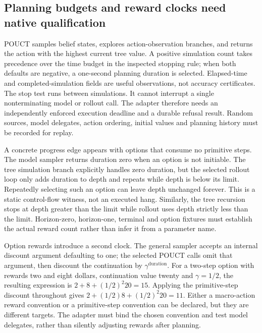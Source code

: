 \subsection{Planning budgets and reward clocks need native qualification}
\label{exec23:pomdppy-planning}
POUCT samples belief states, explores action-observation branches, and returns
the action with the highest current tree value. A positive simulation count
takes precedence over the time budget in the inspected stopping rule; when
both defaults are negative, a one-second planning duration is selected.
Elapsed-time and completed-simulation fields are useful observations, not
accuracy certificates. The stop test runs between simulations. It cannot
interrupt a single nonterminating model or rollout call. The adapter therefore
needs an independently enforced execution deadline and a durable refusal result.
Random sources, model delegates, action ordering, initial values and planning
history must be recorded for replay. \cite{exec23_pomdppy_sources}

A concrete progress edge appears with options that consume no primitive steps.
The model sampler returns duration zero when an option is not initiable.
The tree simulation branch explicitly handles zero duration, but the selected
rollout loop only adds duration to depth and repeats while depth is below its
limit. Repeatedly selecting such an option can leave depth unchanged forever.
This is a static control-flow witness, not an executed hang. Similarly, the
tree recursion stops at depth greater than the limit while rollout uses depth
strictly less than the limit. Horizon-zero, horizon-one, terminal and option
fixtures must establish the actual reward count rather than infer it from a
parameter name. \cite{exec23_pomdppy_sources,exec23_pomdppy_reference}

Option rewards introduce a second clock. The general sampler accepts an
internal discount argument defaulting to one; the selected POUCT calls omit
that argument, then discount the continuation by $\gamma^{\text{duration}}$.
For a two-step option with rewards two and eight dollars, continuation value
twenty and $\gamma=1/2$, the resulting expression is $2+8+(1/2)^2 20=15$.
Applying the primitive-step discount throughout gives
$2+(1/2)8+(1/2)^2 20=11$. Either a macro-action reward convention or a
primitive-step convention can be declared, but they are different targets.
The adapter must bind the chosen convention and test model delegates, rather
than silently adjusting rewards after planning.
\cite{exec23_pomdppy_sources,exec23_pomdppy_reference}

